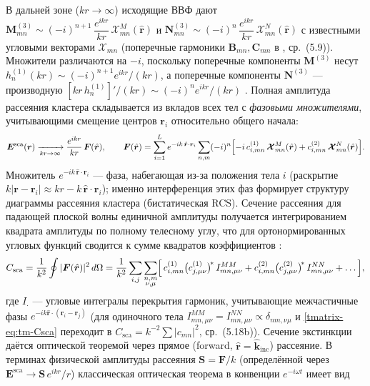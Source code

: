 \documentclass[11pt,a4paper]{article}
\begin{document}
В дальней зоне ($kr\to\infty$) исходящие ВВФ дают
$\bm{M}_{mn}^{(3)}\sim (-i)^{n+1}\,\dfrac{e^{ikr}}{kr}\,\bm{\mathcal{X}}^{M}_{mn}(\hat{\bm{r}})$ и
$\bm{N}_{mn}^{(3)}\sim (-i)^{n}\,\dfrac{e^{ikr}}{kr}\,\bm{\mathcal{X}}^{N}_{mn}(\hat{\bm{r}})$
с известными угловыми векторами $\bm{\mathcal{X}}_{mn}$ (поперечные гармоники $\bm{B}_{mn},\bm{C}_{mn}$ в \cite{mishchenko2002}, ср.\ (5.9)). Множители различаются на $-i$, поскольку поперечные компоненты $\bm{M}^{(3)}$ несут $h_n^{(1)}(kr)\sim(-i)^{n+1}e^{ikr}/(kr)$, а поперечные компоненты $\bm{N}^{(3)}$ --- производную $[kr\,h_n^{(1)}]'/(kr)\sim(-i)^{n}e^{ikr}/(kr)$ \cite{bohren1983,mishchenko2002,dlmf}. Полная амплитуда рассеяния кластера складывается из вкладов всех тел с \emph{фазовыми множителями}, учитывающими смещение центров $\bm{r}_i$ относительно общего начала:
\begin{equation}
\bm{E}^{\mathrm{sca}}(\bm{r})\xrightarrow[kr\to\infty]{}
\frac{e^{ikr}}{kr}\,\bm{F}(\hat{\bm{r}}),\qquad
\bm{F}(\hat{\bm{r}})=\sum_{i=1}^{L} e^{-ik\,\hat{\bm{r}}\cdot\bm{r}_i}
\sum_{n,m}(-i)^{n}\Bigl[-i\,c_{i,mn}^{(1)}\,\bm{\mathcal{X}}^{M}_{mn}(\hat{\bm{r}})+c_{i,mn}^{(2)}\,\bm{\mathcal{X}}^{N}_{mn}(\hat{\bm{r}})\Bigr].
\label{tmatrix-eq:tm-farfield}
\end{equation}
Множитель $e^{-ik\,\hat{\bm{r}}\cdot\bm{r}_i}$ --- фаза, набегающая из-за положения тела $i$ (раскрытие $k|\bm{r}-\bm{r}_i|\approx kr-k\,\hat{\bm{r}}\cdot\bm{r}_i$); именно интерференция этих фаз формирует структуру диаграммы рассеяния кластера (бистатическая RCS). Сечение рассеяния для падающей плоской волны единичной амплитуды получается интегрированием квадрата амплитуды по полному телесному углу, что для ортонормированных угловых функций сводится к сумме квадратов коэффициентов \cite{mishchenko2002}:
\begin{equation}
C_{\mathrm{sca}} = \frac{1}{k^2}\oint |\bm{F}(\hat{\bm{r}})|^2\,d\Omega
= \frac{1}{k^2}\sum_{i,j}\sum_{\substack{n,m\\ \nu,\mu}}
\Bigl[\,c_{i,mn}^{(1)}\bigl(c_{j,\mu\nu}^{(1)}\bigr)^{\!*}\,I^{MM}_{mn,\mu\nu}
+ c_{i,mn}^{(2)}\bigl(c_{j,\mu\nu}^{(2)}\bigr)^{\!*}\,I^{NN}_{mn,\mu\nu}+\dots\Bigr],
\label{tmatrix-eq:tm-Csca}
\end{equation}
где $I_{\cdot}$ --- угловые интегралы перекрытия гармоник, учитывающие межчастичные фазы $e^{-ik\hat{\bm{r}}\cdot(\bm{r}_i-\bm{r}_j)}$ (для одиночного тела $I^{MM}_{mn,\mu\nu}=I^{NN}_{mn,\mu\nu}\propto\delta_{nm,\nu\mu}$ и \eqref{tmatrix-eq:tm-Csca} переходит в $C_{\mathrm{sca}}=k^{-2}\sum|c_{mn}|^2$, ср.\ (5.18b)). Сечение экстинкции даётся оптической теоремой через прямое (forward, $\hat{\bm{r}}=\hat{\bm{k}}_{\mathrm{inc}}$) рассеяние. В терминах физической амплитуды рассеяния $\bm{S}=\bm{F}/k$ (определённой через $\bm{E}^{\mathrm{sca}}\to\bm{S}\,e^{ikr}/r$) классическая оптическая теорема в конвенции $e^{-i\omega t}$ имеет вид \cite{bohren1983,mishchenko2002}
\end{document}
